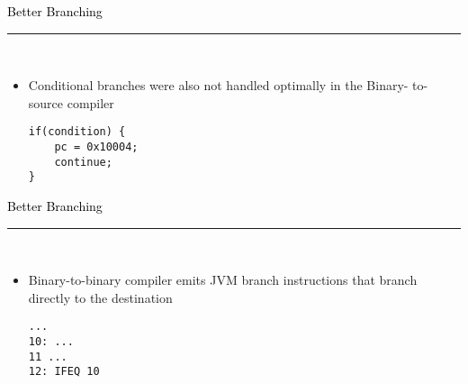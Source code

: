 \documentclass[letter]{seminar}
\begin{document}
\begin{slide}\raggedright
\renewcommand{\leftmargini}{5mm}
{\Large{\textcolor{black}{Better Branching}}}
\\\rule{\textwidth}{0.1pt}\\

\begin{itemize}


\item
     Conditional branches were also not handled optimally in the Binary-
      to-source compiler


\vspace{5mm}



\begin{Verbatim}[fontsize=\tiny,frame=single,rulecolor=\color{CodeBorder},resetmargins=true,gobble=0]
if(condition) {
    pc = 0x10004;
    continue;
}
\end{Verbatim}


\end{itemize}


\end{slide}


\begin{slide}\raggedright
\renewcommand{\leftmargini}{5mm}
{\Large{\textcolor{black}{Better Branching}}}
\\\rule{\textwidth}{0.1pt}\\

\begin{itemize}


\item
     Binary-to-binary compiler emits JVM branch instructions that 
      branch directly to the destination


\vspace{5mm}



\begin{Verbatim}[fontsize=\tiny,frame=single,rulecolor=\color{CodeBorder},resetmargins=true,gobble=0]
...
10: ...
11 ...
12: IFEQ 10
\end{Verbatim}


\end{itemize}


\end{slide}
\end{document}
